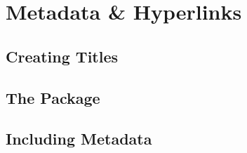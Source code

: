 \section{Metadata \& Hyperlinks}


\subsection{Creating Titles}
\begin{frame}

\end{frame}

\subsection{The  Package}
\begin{frame}

\end{frame}

\subsection{Including Metadata}
\begin{frame}

\end{frame}
